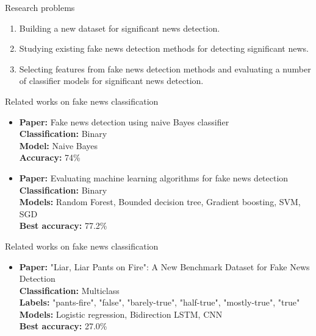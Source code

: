 \documentclass[12pt]{beamer}
\begin{document}
\begin{frame}{Research problems}
    \begin{enumerate}
        \item Building a new dataset for significant news detection.
        \item Studying existing fake news detection methods for detecting significant news.
        \item Selecting features from fake news detection methods and evaluating a number of classifier models for significant news detection.
    \end{enumerate}
\end{frame}

\begin{frame}{Related works on fake news classification}
    \begin{itemize}
        \item
        \textbf{Paper:} Fake news detection using naive Bayes classifier \\
        \textbf{Classification:} Binary \\
        \textbf{Model:} Naive Bayes \\
        \textbf{Accuracy:} 74\% \\

        \item
        \textbf{Paper:} Evaluating machine learning algorithms for fake news detection \\
        \textbf{Classification:} Binary \\
        \textbf{Models:} Random Forest, Bounded decision tree, Gradient boosting, SVM, SGD \\
        \textbf{Best accuracy:} 77.2\% \\
    \end{itemize}
\end{frame}

\begin{frame}{Related works on fake news classification}
    \begin{itemize}
        \item
        \textbf{Paper:} "Liar, Liar Pants on Fire": A New Benchmark Dataset for Fake News Detection \\
        \textbf{Classification:} Multiclass \\
        \textbf{Labels:} "pants-fire", "false", "barely-true", "half-true", "mostly-true", "true"\\
        \textbf{Models:} Logistic regression, Bidirection LSTM, CNN \\
        \textbf{Best accuracy:} 27.0\% \\
    \end{itemize}
\end{frame}
\end{document}
